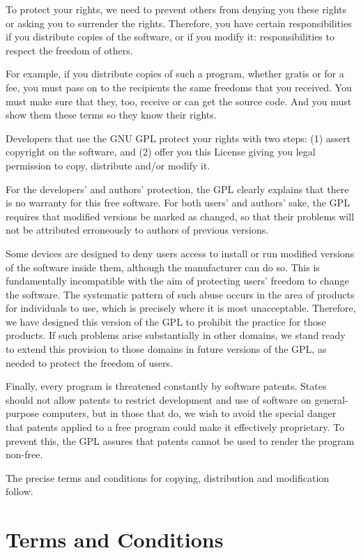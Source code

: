 To protect your rights, we need to prevent others from denying you
these rights or asking you to surrender the rights.  Therefore, you have
certain responsibilities if you distribute copies of the software, or if
you modify it: responsibilities to respect the freedom of others.

For example, if you distribute copies of such a program, whether
gratis or for a fee, you must pass on to the recipients the same
freedoms that you received.  You must make sure that they, too, receive
or can get the source code.  And you must show them these terms so they
know their rights.

Developers that use the GNU GPL protect your rights with two steps:
(1) assert copyright on the software, and (2) offer you this License
giving you legal permission to copy, distribute and/or modify it.

For the developers' and authors' protection, the GPL clearly explains
that there is no warranty for this free software.  For both users' and
authors' sake, the GPL requires that modified versions be marked as
changed, so that their problems will not be attributed erroneously to
authors of previous versions.

Some devices are designed to deny users access to install or run
modified versions of the software inside them, although the manufacturer
can do so.  This is fundamentally incompatible with the aim of
protecting users' freedom to change the software.  The systematic
pattern of such abuse occurs in the area of products for individuals to
use, which is precisely where it is most unacceptable.  Therefore, we
have designed this version of the GPL to prohibit the practice for those
products.  If such problems arise substantially in other domains, we
stand ready to extend this provision to those domains in future versions
of the GPL, as needed to protect the freedom of users.

Finally, every program is threatened constantly by software patents.
States should not allow patents to restrict development and use of
software on general-purpose computers, but in those that do, we wish to
avoid the special danger that patents applied to a free program could
make it effectively proprietary.  To prevent this, the GPL assures that
patents cannot be used to render the program non-free.

The precise terms and conditions for copying, distribution and
modification follow.
\normalsize


\section{Terms and Conditions}


